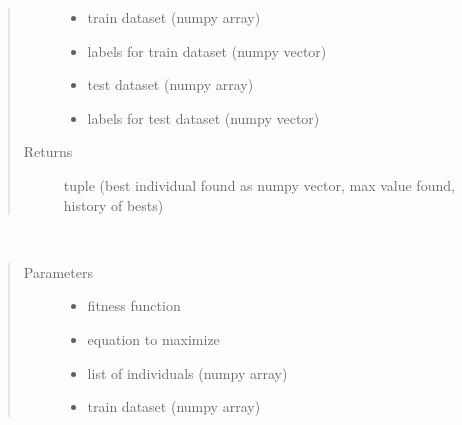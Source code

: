 \documentclass[letterpaper,10pt,english]{sphinxmanual}
\begin{document}
\begin{fulllineitems}
\begin{fulllineitems}
\begin{quote}
\begin{description}
\begin{itemize}
\item {} 
 \textendash{} train dataset (numpy array)

\item {} 
 \textendash{} labels for train dataset (numpy vector)

\item {} 
 \textendash{} test dataset (numpy array)

\item {} 
 \textendash{} labels for test dataset (numpy vector)

\end{itemize}

\item[{Returns}] \leavevmode
tuple (best individual found as numpy vector, max value found, history of bests)

\end{description}\end{quote}

\end{fulllineitems}


\begin{fulllineitems}
\label{\detokenize{index:genetic_optimizer.GeneticNeuralOptimizer.best_of_generation}}~\begin{quote}\begin{description}
\item[{Parameters}] \leavevmode\begin{itemize}
\item {} 
 \textendash{} fitness function

\item {} 
 \textendash{} equation to maximize

\item {} 
 \textendash{} list of individuals (numpy array)

\item {} 
 \textendash{} train dataset (numpy array)


\end{itemize}
\end{description}
\end{quote}
\end{fulllineitems}
\end{fulllineitems}
\end{document}

